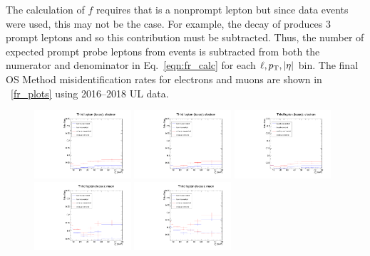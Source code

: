 The calculation of $f$ requires that \looselep is a nonprompt lepton but since data events were used, this may not be the case.
For example, the decay of \WZ produces 3 prompt leptons and so this contribution must be subtracted.
Thus, the number of expected prompt probe leptons from \WZ events is subtracted from both the numerator and denominator in Eq.~\ref{eqn:fr_calc} for each $\ell, p_{\mathrm{T}}, \lvert \eta \rvert$ bin.
The final OS Method misidentification rates for electrons and muons are shown in \figurename~\ref{fr_plots} using 2016--2018 UL data.
\begin{figure}[!htbp]
	\begin{center}
		\includegraphics[width=0.32\textwidth]{figures/higgsmassmeas/redbkg/fr/fakerates_UL2016_el.pdf}
		\includegraphics[width=0.32\textwidth]{figures/higgsmassmeas/redbkg/fr/fakerates_UL2017_el.pdf}
		\includegraphics[width=0.32\textwidth]{figures/higgsmassmeas/redbkg/fr/fakerates_UL2018_el.pdf}
		\includegraphics[width=0.32\textwidth]{figures/higgsmassmeas/redbkg/fr/fakerates_UL2016_mu.pdf}
		\includegraphics[width=0.32\textwidth]{figures/higgsmassmeas/redbkg/fr/fakerates_UL2017_mu.pdf}

\end{center}
\end{figure}
